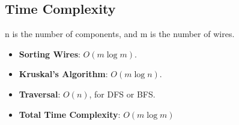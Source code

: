 \begin{solution}
\subsection*{Time Complexity}
n is the number of components, and m is the number of wires.
\begin{itemize}
    \item \textbf{Sorting Wires}: $O(m \log m)$.
    \item \textbf{Kruskal's Algorithm}: $O(m \log n)$.
    \item \textbf{Traversal}: $O(n)$, for DFS or BFS.
    \item \textbf{Total Time Complexity}: $O(m \log m)$ 
\end{itemize}

\end{solution}